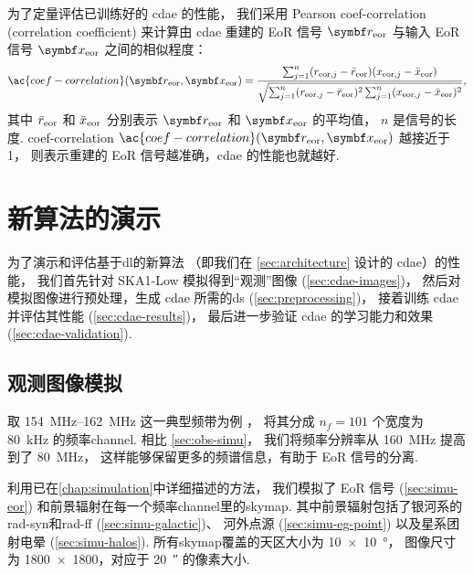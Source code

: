 为了定量评估已训练好的 \ac{cdae} 的性能，
我们采用 Pearson \acl{coef-correlation} (correlation coefficient)
\cite{harker2009,chapman2013}
来计算由 \ac{cdae} 重建的 EoR 信号 $\B{r}_{\R{eor}}$ 与输入 EoR 信号
$\B{x}_{\R{eor}}$ 之间的相似程度：
\begin{equation}
  \label{eq:corrcoef}
  \ac{coef-correlation}(\B{r}_{\R{eor}}, \B{x}_{\R{eor}})
      = \frac{\sum_{j=1}^{n}(r_{\R{eor},j} - \bar{r}_{\R{eor}})
            (x_{\R{eor},j} - \bar{x}_{\R{eor}})}{
          \sqrt{\sum_{j=1}^{n}(r_{\R{eor},j} - \bar{r}_{\R{eor}})^2
            \sum_{j=1}^{n}(x_{\R{eor},j} - \bar{x}_{\R{eor}})^2}
        } ,
\end{equation}
其中
$\bar{r}_{\mathrm{eor}}$ 和 $\bar{x}_{\mathrm{eor}}$ 分别表示
$\B{r}_{\R{eor}}$ 和 $\B{x}_{\R{eor}}$ 的平均值，
$n$ 是信号的长度.
\acl{coef-correlation}
$\ac{coef-correlation}(\B{r}_{\R{eor}}, \B{x}_{\R{eor}})$ 越接近于 1，
则表示重建的 EoR 信号越准确，\ac{cdae} 的性能也就越好.


\section{新算法的演示}

为了演示和评估基于\ac{dl}的新算法
（即我们在 \autoref{sec:architecture} 设计的 \ac{cdae}）的性能，
我们首先针对 SKA1-Low 模拟得到\enquote{观测}图像 (\autoref{sec:cdae-images})，
然后对模拟图像进行预处理，生成 \ac{cdae} 所需的\ac{ds} (\autoref{sec:preprocessing})，
接着训练 \ac{cdae} 并评估其性能 (\autoref{sec:cdae-results})，
最后进一步验证 \ac{cdae} 的学习能力和效果 (\autoref{sec:cdae-validation}).

\subsection{观测图像模拟}
\label{sec:cdae-images}

取 \SIrange{154}{162}{\MHz} 这一典型频带为例 \cite{datta2010}，
将其分成 $n_f = 101$ 个宽度为 \SI{80}{\kHz} 的频率\ac{channel}.
相比 \autoref{sec:obs-simu}，
我们将频率分辨率从 \SI{160}{\MHz} 提高到了 \SI{80}{\MHz}，
这样能够保留更多的频谱信息，有助于 EoR 信号的分离.

利用已在\autoref{chap:simulation}中详细描述的方法，
我们模拟了 EoR 信号 (\autoref{sec:simu-eor})
和前景辐射在每一个频率\ac{channel}里的\ac{skymap}.
其中前景辐射包括了银河系的\ac{rad-syn}和\ac{rad-ff} (\autoref{sec:simu-galactic})、
河外点源 (\autoref{sec:simu-eg-point})
以及星系团射电晕 (\autoref{sec:simu-halos}).
所有\ac{skymap}覆盖的天区大小为 \SI{10 x 10}{\degree}，
图像尺寸为 \num{1800 x 1800}，对应于 \SI{20}{\arcsecond} 的像素大小.

